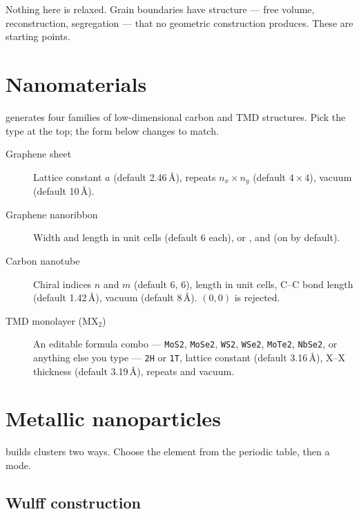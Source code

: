 \begin{calwarn}
Nothing here is relaxed. Grain boundaries have structure --- free volume,
reconstruction, segregation --- that no geometric construction produces.
These are starting points.
\end{calwarn}

\section{Nanomaterials}

\menusep{} generates four families of
low-dimensional carbon and TMD structures. Pick the type at the top; the
form below changes to match.

\begin{description}
  \item[Graphene sheet] Lattice constant $a$ (default 2.46\,\AA), repeats
    $n_x \times n_y$ (default $4 \times 4$), vacuum (default 10\,\AA).
  \item[Graphene nanoribbon] Width and length in unit cells (default 6 each),
      or , and
     (on by default).
  \item[Carbon nanotube] Chiral indices $n$ and $m$ (default 6, 6), length
    in unit cells, C--C bond length (default 1.42\,\AA), vacuum (default
    8\,\AA). $(0,0)$ is rejected.
  \item[TMD monolayer (MX$_2$)] An editable formula combo --- \texttt{MoS2},
    \texttt{MoSe2}, \texttt{WS2}, \texttt{WSe2}, \texttt{MoTe2},
    \texttt{NbSe2}, or anything else you type ---  \texttt{2H} or
    \texttt{1T}, lattice constant (default 3.16\,\AA), X--X thickness
    (default 3.19\,\AA), repeats and vacuum.
\end{description}

\section{Metallic nanoparticles}
\label{sec:nanoparticle}

\menusep{} builds clusters
two ways. Choose the element from the periodic table, then a mode.

\subsection{Wulff construction}

